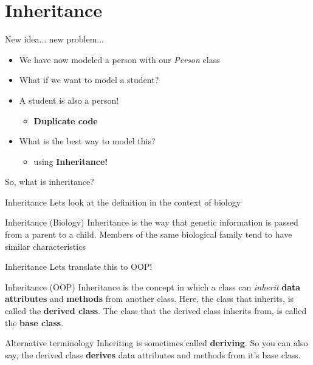 \section{Inheritance}

\begin{frame}{New idea... new problem...}
    \begin{itemize}
        \pause
        \item We have now modeled a person with our \textit{Person} class
        \pause
        \item What if we want to model a student?
        \pause
        \item A student is also a person!
        \begin{itemize}
            \pause
            \item \textbf{Duplicate code}
        \end{itemize}
        \pause
        \item What is the best way to model this?
        \begin{itemize}
            \pause
            \item using \textbf{Inheritance!}
        \end{itemize}
    \end{itemize}
\end{frame}

\begin{frame}[plain]
So, what is inheritance?
\end{frame}

\begin{frame}{Inheritance}
    Lets look at the definition in the context of biology
    \pause
    \begin{block}{Inheritance (Biology)}
    Inheritance is the way that genetic information is passed from a parent to a child. Members of the same biological family tend to have similar characteristics
    \end{block}
\end{frame}

\begin{frame}{Inheritance}
    Lets translate this to OOP!
    \pause
    \begin{block}{Inheritance (OOP)}
    Inheritance is the concept in which a class can \textit{inherit} \textbf{data attributes} and \textbf{methods} from another class. Here, the class that inherits, is called the \textbf{derived class}. The class that the derived class inherits from, is called the \textbf{base class}.
    \end{block}
    \pause
    \begin{alertblock}{Alternative terminology}
        Inheriting is sometimes called \textbf{deriving}. So you can also say, the derived class \textbf{derives} data attributes and methods from it's base class.
    \end{alertblock}
\end{frame}

